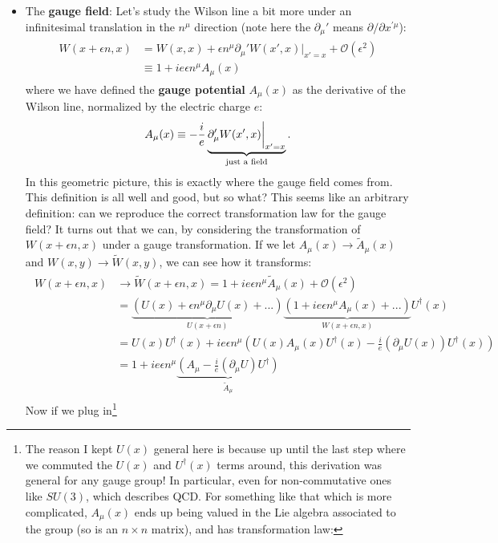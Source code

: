 \documentclass[12pt, oneside]{article}   	%
\theoremstyle{definition}
\begin{document}
\begin{itemize}
	\item The \textbf{gauge field}: Let's study the Wilson line a bit more under an infinitesimal translation in the $n^\mu$ direction (note here the $\partial_\mu'$ means $\partial / \partial x^{\prime \mu}$):
	\begin{align}\begin{split}
		W(x + \epsilon n, x) &= W(x, x) + \epsilon n^\mu \partial_\mu' W(x', x) \bigg|_{x' = x} + \mathcal O(\epsilon^2) \\
		&\equiv 1 + ie \epsilon n^\mu A_\mu(x)
	\end{split}\end{align}
	where we have defined the \textbf{gauge potential} $A_\mu(x)$ as the derivative of the Wilson line, normalized by the electric charge $e$:
	\begin{equation}
		A_\mu(x)\equiv -\frac{i}{e} \underbrace{\partial_\mu' W(x', x)\bigg|_{x' = x}}_{\textnormal{just a field}}. \label{eq:amu_dfn}
	\end{equation}
	In this geometric picture, this is exactly where the gauge field comes from. This definition is all well and good, but so what? This seems like an arbitrary definition: can we reproduce the correct transformation law for the gauge field? It turns out that we can, by considering the transformation of $W(x + \epsilon n, x)$ under a gauge transformation. If we let $A_\mu(x)\longrightarrow\tilde A_\mu(x)$ and $W(x, y)\longrightarrow \tilde W(x, y)$, we can see how it transforms:
	\begin{align} \begin{split}
		W(x + \epsilon n, x) &\longrightarrow \tilde W(x + \epsilon n, x) = 1 + ie \epsilon n^\mu \tilde A_\mu(x) + \mathcal O(\epsilon^2) \\
		&= \underbrace{(U(x) + \epsilon n^\mu \partial_\mu U(x) + ... )}_{U(x + \epsilon n)} \underbrace{(1 + ie \epsilon n^\mu A_\mu(x) + ...)}_{W(x + \epsilon n, x)} U^\dagger(x) \\
		&= U(x) U^\dagger(x) + i e \epsilon n^\mu \left( U(x) A_\mu(x) U^\dagger(x) - \frac{i}{e} (\partial_\mu U(x)) U^\dagger(x) \right) \\
		&= 1 + ie\epsilon n^\mu \underbrace{ \left(A_\mu - \frac{i}{e} (\partial_\mu U ) U^\dagger \right)}_{\tilde A_\mu}
	\end{split} \end{align}
	Now if we plug in\footnote{The reason I kept $U(x)$ general here is because up until the last step where we commuted the $U(x)$ and $U^\dagger(x)$ terms around, this derivation was general for any gauge group! In particular, even for non-commutative ones like $SU(3)$, which describes QCD. For something like that which is more complicated, $A_\mu(x)$ ends up being valued in the Lie algebra associated to the group (so is an $n\times n$ matrix), and has transformation law:
}
\end{itemize}
\end{document}
